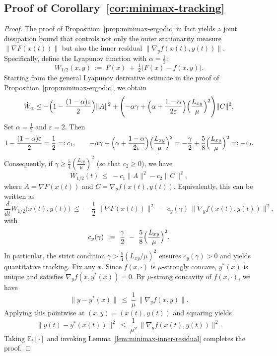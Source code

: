 \documentclass{article}
\newcommand{\1}{\mathbf{1}}
\begin{document}
\subsection{Proof of Corollary~\ref{cor:minimax-tracking}}\label{subsec:proof-corr}
\begin{proof}
The proof of Proposition~\ref{prop:minimax-ergodic} in fact yields a joint dissipation bound that controls
not only the outer stationarity measure $\|\nabla F(x(t))\|$ but also the inner residual
$\|\nabla_y f(x(t),y(t))\|$.
Specifically, define the Lyapunov function with $\alpha=\tfrac12$:
\[
W_{1/2}(x,y)\ :=\ F(x)\ +\ \tfrac12\bigl(F(x)-f(x,y)\bigr).
\]
Starting from the general Lyapunov derivative estimate in the proof of
Proposition~\ref{prop:minimax-ergodic}, we obtain
\[
\dot W_\alpha
\le
-\Bigl(1-\frac{(1-\alpha)\varepsilon}{2}\Bigr)\|A\|^2
+\Biggl(-\alpha\gamma+\Bigl(\alpha+\frac{1-\alpha}{2\varepsilon}\Bigr)\Bigl(\frac{L_{xy}}{\mu}\Bigr)^2\Biggr)\|C\|^2.
\]
Set $\alpha=\tfrac12$ and $\varepsilon=2$. Then
\[
1-\frac{(1-\alpha)\varepsilon}{2}=\frac12=:c_1,
\qquad
-\alpha\gamma+\Bigl(\alpha+\frac{1-\alpha}{2\varepsilon}\Bigr)\Bigl(\frac{L_{xy}}{\mu}\Bigr)^2
=-\frac{\gamma}{2}+\frac{5}{8}\Bigl(\frac{L_{xy}}{\mu}\Bigr)^2=:-c_2.
\]
Consequently, if $\gamma\ge \frac{5}{4}\left(\frac{L_{xy}}{\mu}\right)^2$ (so that $c_2\ge 0$), we have
\[
\dot W_{1/2}(t)\ \le\ -c_1\|A\|^2-c_2\|C\|^2,
\]
where $A=\nabla F(x(t))$ and $C=\nabla_y f(x(t),y(t))$.
Equivalently, this can be written as
\begin{equation}\label{eq:minimax-dissipation}
\frac{d}{dt}W_{1/2}\bigl(x(t),y(t)\bigr)
\ \le\
-\frac12\,\bigl\|\nabla F(x(t))\bigr\|^{2}
\ -\
c_y(\gamma)\,\bigl\|\nabla_y f(x(t),y(t))\bigr\|^{2},
\end{equation}
with
\begin{equation}\label{eq:cy-def}
c_y(\gamma)\ :=\ \frac{\gamma}{2}\ -\ \frac{5}{8}\Bigl(\frac{L_{xy}}{\mu}\Bigr)^{2}.
\end{equation}
In particular, the strict condition $\gamma>\tfrac54(L_{xy}/\mu)^2$ ensures $c_y(\gamma)>0$ and yields quantitative tracking.
Fix any $x$. Since $f(x,\cdot)$ is $\mu$-strongly concave, $y^*(x)$ is unique and satisfies
$\nabla_y f(x,y^*(x))=0$. 
By $\mu$-strong concavity of $f(x,\cdot)$, we have
\[
\|y-y^*(x)\|\ \le\ \frac{1}{\mu}\,\|\nabla_y f(x,y)\|.
\]
Applying this pointwise at $(x,y)=(x(t),y(t))$ and squaring yields
\[
\|y(t)-y^*(x(t))\|^2 \ \le\ \frac{1}{\mu^2}\,\|\nabla_y f(x(t),y(t))\|^2.
\]
Taking $\mathbb E_t[\cdot]$ and invoking Lemma~\ref{lem:minimax-inner-residual} completes the proof.
\end{proof}
\end{document}
